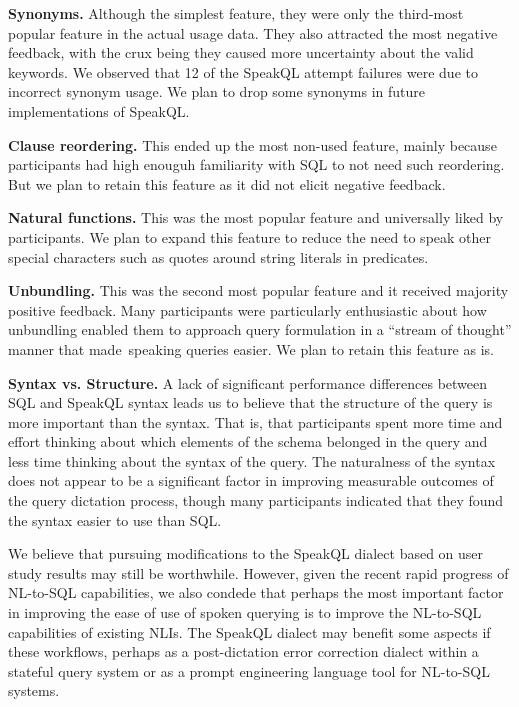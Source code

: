 \textbf{Synonyms.} Although the simplest feature, they were only the third-most popular feature in the actual usage data. They also attracted the most negative feedback, with the crux being they caused more uncertainty about the valid keywords. We observed that 12 of the SpeakQL attempt failures were due to incorrect synonym usage. We plan to drop some synonyms in future implementations of SpeakQL. 

\textbf{Clause reordering.} This ended up the most non-used feature, mainly because participants had high enouguh familiarity with SQL to not need such reordering. But we plan to retain this feature as it did not elicit negative feedback.

\textbf{Natural functions.} This was the most popular feature and universally liked by participants. We plan to expand this feature to reduce the need to speak other special characters such as quotes around string literals in predicates.

\textbf{Unbundling.} This was the second most popular feature and it received majority positive feedback. Many participants were particularly enthusiastic about how unbundling enabled them to approach query formulation in a ``stream of thought'' manner that made speaking queries easier. We plan to retain this feature as is.

\textbf{Syntax vs. Structure.} A lack of significant performance differences between SQL and SpeakQL syntax leads us to believe that the structure of the query is more important than the syntax.
That is, that participants spent more time and effort thinking about which elements of the schema belonged in the query and less time thinking about the syntax of the query.
The naturalness of the syntax does not appear to be a significant factor in improving measurable outcomes of the query dictation process, though many participants indicated that they found the syntax easier to use than SQL. 

We believe that pursuing modifications to the SpeakQL dialect based on user study results may still be worthwhile. 
However, given the recent rapid progress of NL-to-SQL capabilities, we also condede that perhaps the most important factor in improving the ease of use of spoken querying is to improve the NL-to-SQL capabilities of existing NLIs.
The SpeakQL dialect may benefit some aspects if these workflows, perhaps as a post-dictation error correction dialect within a stateful query system or as a prompt engineering language tool for NL-to-SQL systems.

